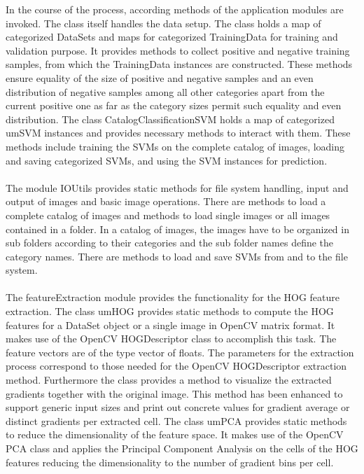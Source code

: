 In the course of the process, according methods of the application modules are invoked. The class itself handles the data setup. The class holds a map of categorized DataSets and maps for categorized TrainingData for training and validation purpose. It provides methods to collect positive and negative training samples, from which the TrainingData instances are constructed. These methods ensure equality of the size of positive and negative samples and an even distribution of negative samples among all other categories apart from the current positive one as far as the category sizes permit such equality and even distribution. The class CatalogClassificationSVM holds a map of categorized umSVM instances and provides necessary methods to interact with them. These methods include training the SVMs on the complete catalog of images, loading and saving categorized SVMs, and using the SVM instances for prediction.
\\
\\
The module IOUtils provides static methods for file system handling, input and output of images and basic image operations. There are methods to load a complete catalog of images and methods to load single images or all images contained in a folder. In a catalog of images, the images have to be organized in sub folders according to their categories and the sub folder names define the category names. There are methods to load and save SVMs from and to the file system.
\\
\\
The featureExtraction module provides the functionality for the HOG feature extraction. The class umHOG provides static methods to compute the HOG features for a DataSet object or a single image in OpenCV matrix format. It makes use of the OpenCV HOGDescriptor class to accomplish this task. The feature vectors are of the type vector of floats. The parameters for the extraction process correspond to those needed for the OpenCV HOGDescriptor extraction method. Furthermore the class provides a method to visualize the extracted gradients together with the original image. This method  has been enhanced to support generic input sizes and print out concrete values for gradient average or distinct gradients per extracted cell. The class umPCA provides static methods to reduce the dimensionality of the feature space. It makes use of the OpenCV PCA class and applies the Principal Component Analysis on the cells of the HOG features reducing the dimensionality to the number of gradient bins per cell.
